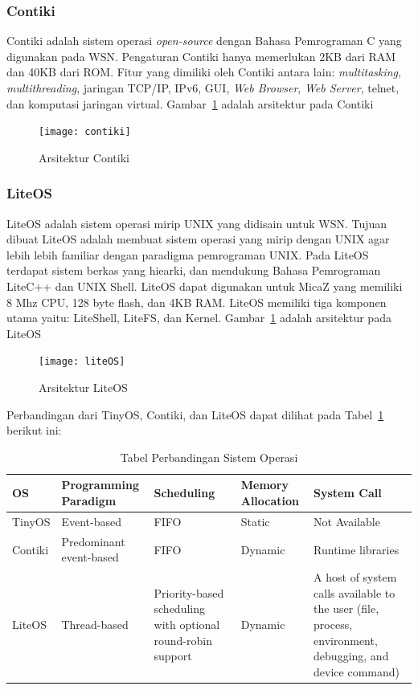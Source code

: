 \subsubsection{Contiki}
Contiki adalah sistem operasi \textit{open-source} dengan Bahasa Pemrograman C yang digunakan pada WSN. Pengaturan Contiki hanya memerlukan 2KB dari RAM dan 40KB dari ROM. Fitur yang dimiliki oleh Contiki antara lain: \textit{multitasking}, \textit{multithreading}, jaringan TCP/IP, IPv6, GUI, \textit{Web Browser}, \textit{Web Server}, telnet, dan komputasi jaringan virtual. Gambar~\ref{fig:contiki} adalah arsitektur pada Contiki
\begin{figure} [H]
	\centering  
	\texttt{[image: contiki]}  
	\caption[Arsitektur Contiki]{Arsitektur Contiki} 
	\label{fig:contiki} 
\end{figure}

\subsubsection{LiteOS}
LiteOS adalah sistem operasi mirip UNIX yang didisain untuk WSN. Tujuan dibuat LiteOS adalah membuat sistem operasi yang mirip dengan UNIX agar lebih lebih familiar dengan paradigma pemrograman UNIX. Pada LiteOS terdapat sistem berkas yang hiearki, dan mendukung Bahasa Pemrograman LiteC++ dan UNIX Shell. LiteOS dapat digunakan untuk MicaZ yang memiliki 8 Mhz CPU, 128 byte flash, dan 4KB RAM. LiteOS memiliki tiga komponen utama yaitu: LiteShell, LiteFS, dan Kernel. Gambar~\ref{fig:contiki} adalah arsitektur pada LiteOS
\begin{figure} [H]
	\centering  
	\texttt{[image: liteOS]}  
	\caption[Arsitektur LiteOS]{Arsitektur LiteOS} 
	\label{fig:liteOS} 
\end{figure}

Perbandingan dari TinyOS, Contiki, dan LiteOS dapat dilihat pada Tabel~\ref{tab:perbandinganOS} berikut ini:
\begin{table}[H] %
	\centering 
	\caption{Tabel Perbandingan Sistem Operasi}
	\label{tab:perbandinganOS}
	\begin{tabular}{| p{1.6cm} | p{3.8cm} | p{2.5cm} | p{3cm} | p{4cm} |}
		\toprule
		OS & Programming Paradigm & Scheduling & Memory Allocation & System Call\\ 
		
		\midrule
		TinyOS & Event-based & FIFO & Static & Not Available\\
		Contiki & Predominant event-based & FIFO & Dynamic & Runtime libraries\\ 
		LiteOS & Thread-based & Priority-based scheduling with optional round-robin support & Dynamic & A host of system calls available to the user (file, process, environment, debugging, and device command) 	\\ 

		\bottomrule
		
	\end{tabular} 
\end{table}

